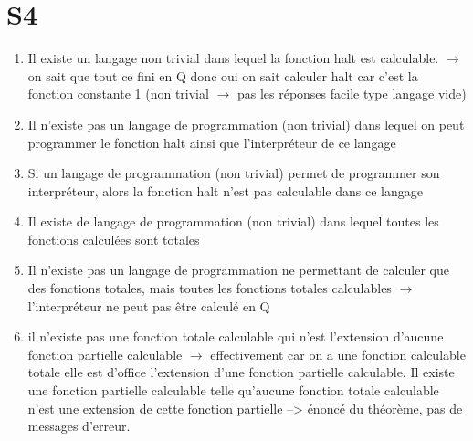 \documentclass{report}
\begin{document}
\section{S4}
\begin{enumerate}
\item Il existe un langage non trivial dans lequel la fonction halt est calculable. $\rightarrow$ on sait que tout ce fini en Q donc oui on sait calculer halt car c'est la fonction constante 1 (non trivial $\rightarrow$ pas les réponses facile type langage vide)
\item Il n'existe pas un langage de programmation (non trivial) dans lequel on peut programmer le fonction halt ainsi que l’interpréteur de ce langage
\item Si un langage de programmation (non trivial) permet de programmer son interpréteur, alors la fonction halt n'est pas calculable dans ce langage
\item Il existe de langage de programmation (non trivial) dans lequel toutes les fonctions calculées sont totales
\item Il n'existe pas un langage de programmation ne permettant de calculer que des fonctions totales, mais toutes les fonctions totales calculables $\rightarrow$ l'interpréteur ne peut pas être calculé en Q
\item il n'existe pas une fonction totale calculable qui n'est l'extension d'aucune fonction partielle calculable $\rightarrow$ effectivement car on a une fonction calculable totale elle est d'office l'extension d'une fonction partielle calculable.
Il existe une fonction partielle calculable telle qu’aucune fonction totale calculable n’est une extension de cette fonction partielle --> énoncé du théorème, pas de messages d'erreur.
\end{enumerate}
\end{document}

